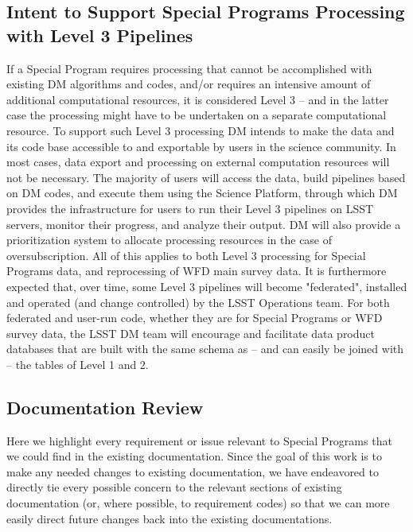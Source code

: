 \documentclass[DM,lsstdraft,toc]{lsstdoc}
\begin{document}
\subsection{Intent to Support Special Programs Processing with Level 3 Pipelines}\label{ssec:dmplans_L3}

If a Special Program requires processing that cannot be accomplished with existing DM algorithms and codes, and/or requires an intensive amount of additional computational resources, it is considered Level 3 -- and in the latter case the processing might have to be undertaken on a separate computational resource. To support such Level 3 processing DM intends to make the data and its code base accessible to and exportable by users in the science community. In most cases, data export and processing on external computation resources will not be necessary. The majority of users will access the data, build pipelines based on DM codes, and execute them using the Science Platform, through which DM provides the infrastructure for users to run their Level 3 pipelines on LSST servers, monitor their progress, and analyze their output. DM will also provide a prioritization system to allocate processing resources in the case of oversubscription. All of this applies to both Level 3 processing for Special Programs data, and reprocessing of WFD main survey data. It is furthermore expected that, over time, some Level 3 pipelines will become "federated", installed and operated (and change controlled) by the LSST Operations team. For both federated and user-run code, whether they are for Special Programs or WFD survey data, the LSST DM team will encourage and facilitate data product databases that are built with the same schema as -- and can easily be joined with -- the tables of Level 1 and 2.

\subsection{Documentation Review}\label{ssec:dmplans_review}

Here we highlight every requirement or issue relevant to Special Programs that we could find in the existing documentation. Since the goal of this work is to make any needed changes to existing documentation, we have endeavored to directly tie every possible concern to the relevant sections of existing documentation (or, where possible, to requirement codes) so that we can more easily direct future changes back into the existing documentations.
\end{document}
